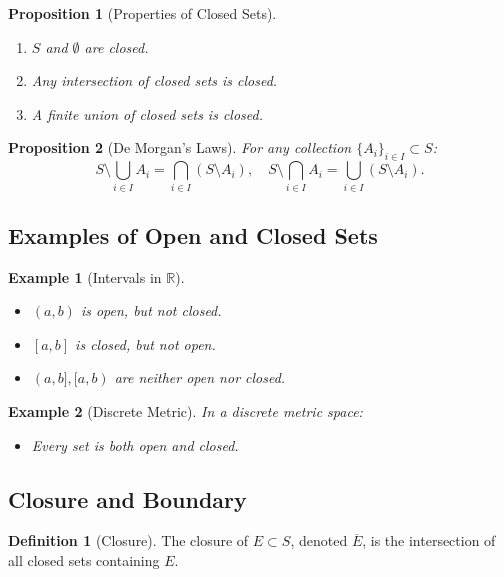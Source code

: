 \documentclass[9pt]{article}
\theoremstyle{definition}
\newtheorem{definition}{Definition}
\theoremstyle{plain}
\newtheorem{proposition}{Proposition}
\newtheorem{example}{Example}
\begin{document}
\begin{proposition}[Properties of Closed Sets]
\leavevmode
\begin{enumerate}
    \item \( S \) and \( \emptyset \) are closed.
    \item Any intersection of closed sets is closed.
    \item A finite union of closed sets is closed.
\end{enumerate}
\end{proposition}

\begin{proposition}[De Morgan's Laws]
For any collection \( \{A_i\}_{i \in I} \subset S \):
\[
S \setminus \bigcup_{i \in I} A_i = \bigcap_{i \in I} (S \setminus A_i), \quad S \setminus \bigcap_{i \in I} A_i = \bigcup_{i \in I} (S \setminus A_i).
\]
\end{proposition}

\subsection*{Examples of Open and Closed Sets}
\begin{example}[Intervals in \( \mathbb{R} \)]
\leavevmode
\begin{itemize}
    \item \( (a, b) \) is open, but not closed.
    \item \( [a, b] \) is closed, but not open.
    \item \( (a, b], [a, b) \) are neither open nor closed.
\end{itemize}
\end{example}

\begin{example}[Discrete Metric]
In a discrete metric space:
\begin{itemize}
    \item Every set is both open and closed.
\end{itemize}
\end{example}

\subsection*{Closure and Boundary}
\begin{definition}[Closure]
The closure of \( E \subset S \), denoted \( \overline{E} \), is the intersection of all closed sets containing \( E \).
\end{definition}
\end{document}
